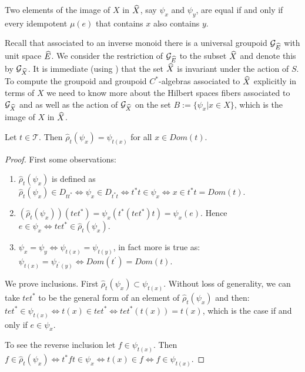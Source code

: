 \begin{corollary}
\begin{remark}
Two elements of the image of $X$ in $\widehat{X}$, say $\psi_{x}$ and $\psi_{y}$, are equal if and only if every idempotent $\mu(e)$ that contains $x$ also contains $y$.
\end{remark}

Recall that associated to an inverse monoid there is a universal groupoid $\mathcal{G}_{\widehat{E}}$ with unit space $\widehat{E}$. We consider the restriction of $\mathcal{G}_{\widehat{E}}$ to  the subset $\widehat{X}$ and denote this by $\mathcal{G}_{\widehat{X}}$. It is immediate (using \cite[Prop 10.10]{MR2419901}) that the set $\widehat{X}$ is invariant under the action of $S$. To compute the groupoid and groupoid $C^{*}$-algebras associated to $\widehat{X}$ explicitly in terms of $X$ we need to know more about the Hilbert spaces fibers associated to $\mathcal{G}_{\widehat{X}}$ and as well as the action of $\mathcal{G}_{\widehat{X}}$ on the set $B:=\lbrace \psi_{x} | x \in X \rbrace$, which is the image of $X$ in $\widehat{X}$.

\begin{proposition}\label{prop:P10}
Let $t \in \mathcal{T}$. Then $\widehat{\rho}_{t}(\psi_{x})=\psi_{t(x)}$ for all $x \in Dom(t)$.
\end{proposition}
\begin{proof}
First some observations:
\begin{enumerate}
\item $\widehat{\rho}_{t}(\psi_{x})$ is defined as $\widehat{\rho}_{t}(\psi_{x}) \in D_{tt^{*}} \Leftrightarrow \psi_{x} \in D_{t^{*}t} \Leftrightarrow t^{*}t \in \psi_{x} \Leftrightarrow x \in t^{*}t = Dom(t)$.
\item $(\widehat{\rho}_{t}(\psi_{x}))(tet^{*})=\psi_{x}(t^{*}(tet^{*})t)=\psi_{x}(e)$. Hence $e \in \psi_{x} \Leftrightarrow tet^{*}  \in \widehat{\rho}_{t}(\psi_{x})$.
\item $\psi_{x}=\psi_{y} \Leftrightarrow \psi_{t(x)}=\psi_{t(y)}$, in fact more is true as: $\psi_{t(x)}=\psi_{t^{'}(y)} \Leftrightarrow Dom(t^{'})=Dom(t)$.
\end{enumerate}
We prove inclusions. First $\widehat{\rho}_{t}(\psi_{x}) \subset \psi_{t(x)}$. Without loss of generality, we can take $tet^{*}$ to be the general form of an element of $\widehat{\rho}_{t}(\psi_{x})$ and then: $tet^{*} \in \psi_{t(x)} \Leftrightarrow t(x) \in tet^{*} \Leftrightarrow tet^{*}(t(x))=t(x)$, which is the case if and only if $e \in \psi_{x}$.

To see the reverse inclusion let $f \in \psi_{t(x)}$. Then $f \in \widehat{\rho}_{t}(\psi_{x}) \Leftrightarrow t^{*}ft \in \psi_{x} \Leftrightarrow t(x) \in f \Leftrightarrow f \in \psi_{t(x)}$. 
\end{proof}


\end{corollary}

